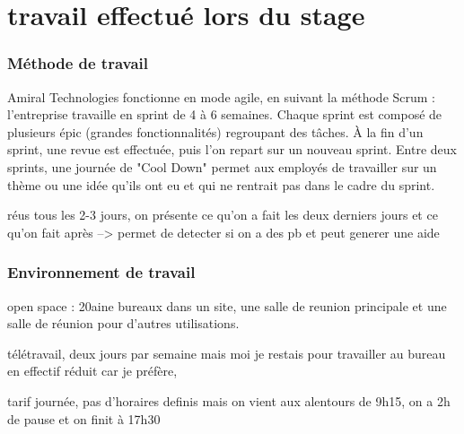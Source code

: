 \section{travail effectué lors du stage}
\subsubsection{Méthode de travail}
Amiral Technologies fonctionne en mode agile, en suivant la méthode Scrum : l’entreprise travaille en sprint de 4 à 6 semaines.
Chaque sprint est composé de plusieurs épic (grandes fonctionnalités) regroupant des tâches.
À la fin d’un sprint, une revue est effectuée, puis l’on repart sur un nouveau sprint.
Entre deux sprints, une journée de "Cool Down" permet aux employés de travailler sur un thème ou une idée qu’ils ont eu et qui ne rentrait pas
dans le cadre du sprint.

réus tous les 2-3 jours, on présente ce qu'on a fait les deux derniers jours et ce qu'on fait après 
--> permet de detecter si on a des pb et peut generer une aide 

\subsubsection{Environnement de travail}
open space : 20aine bureaux dans un site, une salle de reunion principale et une salle de réunion pour d'autres utilisations.

télétravail, deux jours par semaine mais moi je restais pour travailler au bureau en effectif réduit car je préfère,

tarif journée, pas d'horaires definis mais on vient aux alentours de 9h15, on a 2h de pause et on finit à 17h30
